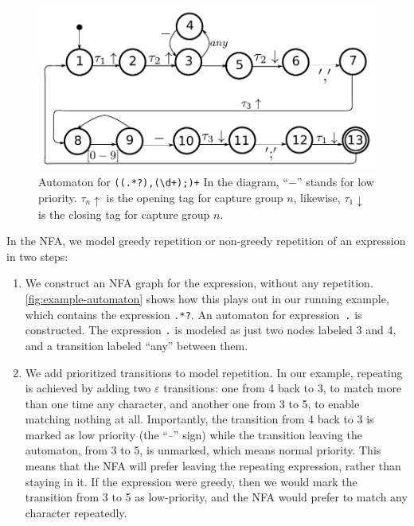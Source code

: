 \documentclass[11pt]{Thesis}
\theoremstyle{definition}
\begin{document}
\begin{figure}[htp]
\includegraphics[width=\linewidth]{graphs/lehrer_automaton}

\caption[NFA for \texttt{((.*?),(\textbackslash{}d+);)+}]{\label{fig:example-automaton}
Automaton for \texttt{((.*?),(\textbackslash{}d+);)+} 
In the diagram, ``$-$'' stands for low priority. $\tau_n\uparrow$ is the
opening tag for capture group $n$, likewise, $\tau_1\downarrow$ is the closing
tag for capture group $n$.}
\end{figure}


In the NFA, we model greedy repetition or non-greedy repetition of
an expression in two steps:

\begin{enumerate}
\item We construct an NFA graph for the expression, without any
repetition.  \autoref{fig:example-automaton} shows how this plays
out in our running example, which contains the expression \texttt{.*?}.
An automaton for expression~\texttt{.} is constructed. The expression
\texttt{.} is modeled as just two nodes labeled 3 and 4, and a
transition labeled ``any'' between them.

\item We add prioritized transitions to model repetition. In our
example, repeating is achieved by adding two $\varepsilon$ transitions:
one from 4 back to 3, to match more than one time any character,
and another one from 3 to 5, to enable matching nothing at all.
Importantly, the transition from 4 back to 3 is marked as low
priority (the ``--'' sign) while the transition leaving the automaton,
from 3 to 5, is unmarked, which means normal priority.  This means
that the NFA will prefer leaving the repeating expression, rather
than staying in it.  If the expression were greedy, then we would
mark the transition from 3 to 5 as low-priority, and the NFA would
prefer to match any character repeatedly.

\end{enumerate}
\end{document}

